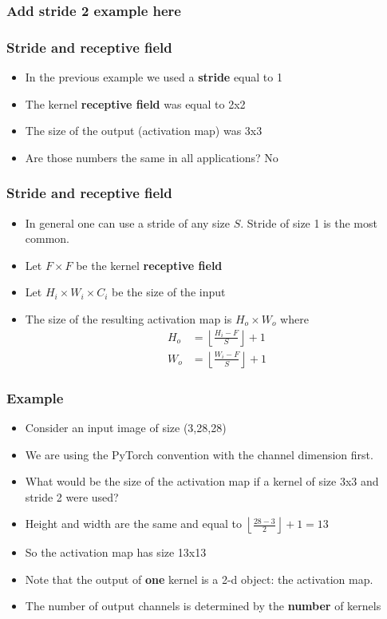 \documentclass{beamer}
\begin{document}
   \begin{frame}
    \frametitle{Add stride 2 example here}
   
    
   
   \end{frame}   
\begin{frame}
    \frametitle{Stride and receptive field}
\begin{itemize}
    \item In the previous example we used a \textbf{stride} equal to 1
    \item The kernel \textbf{receptive field} was equal to 2x2
    \item The size of the output (activation map) was 3x3
    \item Are those numbers the same in all applications? No
\end{itemize}
    

\end{frame}  
\begin{frame}
    \frametitle{Stride and receptive field}
\begin{itemize}
    \item In general one can use a stride of any size $S$. Stride of size 1 is the most common.
    \item Let $F\times F$ be the kernel \textbf{receptive field} 
    \item Let $H_i\times W_i\times C_i$ be the size of the input
    \item The size of the resulting activation map is $H_o\times W_o$ where 
    \begin{align*}
        H_o&=\left\lfloor\frac{H_i-F}{S}\right\rfloor+1\\
        W_o&=\left\lfloor\frac{W_i-F}{S}\right\rfloor+1
    \end{align*}
\end{itemize}
\end{frame}  
\begin{frame}
    \frametitle{Example}
    \begin{itemize}
        \item Consider an input image of size (3,28,28)
        \item We are using the PyTorch convention with the channel dimension first.
        \item What would be the size of the activation map if a kernel of size 3x3 and stride 2 were used?

        \item Height and width are the same and equal to $\left\lfloor\frac{28-3}{2}\right\rfloor+1=13$
        \item So the activation map has size 13x13
        \item Note that the output of \textbf{one} kernel is a 2-d object: the activation map.
        \item The number of output channels is determined by the \textbf{number} of kernels
    \end{itemize}
\end{frame}
\end{document}
